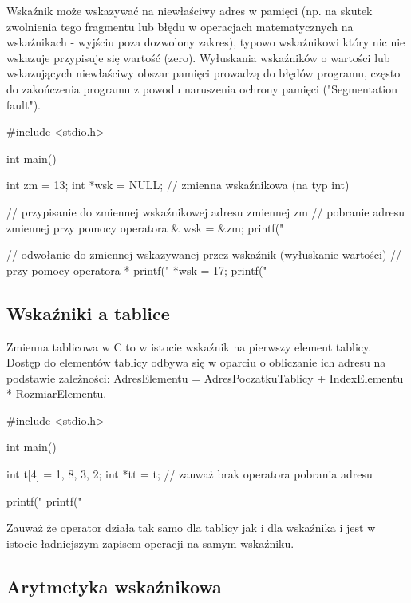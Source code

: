 \documentclass{pdfBooklets}
\begin{document}
Wskaźnik może wskazywać na niewłaściwy adres w pamięci (np. na skutek zwolnienia tego fragmentu lub błędu w operacjach matematycznych na wskaźnikach - wyjściu poza dozwolony zakres), typowo wskaźnikowi który nic nie wskazuje przypisuje się wartość  (zero). Wyłuskania wskaźników o wartości  lub wskazujących niewłaściwy obszar pamięci prowadzą do błędów programu, często do zakończenia programu z powodu naruszenia ochrony pamięci ("Segmentation fault"). 

\begin{CodeFrame*}[c]{}
#include <stdio.h>

int main() {
  int zm = 13;
  int *wsk = NULL; // zmienna wskaźnikowa (na typ int)
  
  // przypisanie do zmiennej wskaźnikowej adresu zmiennej zm
  // pobranie adresu zmiennej przy pomocy operatora &
  wsk = &zm;
  printf("%
  
  // odwołanie do zmiennej wskazywanej przez wskaźnik (wyłuskanie wartości)
  // przy pomocy operatora *
  printf("%
  *wsk = 17;
  printf("%
}
\end{CodeFrame*}

\subsection{Wskaźniki a tablice}

Zmienna tablicowa w C to w istocie wskaźnik na pierwszy element tablicy.
Dostęp do elementów tablicy odbywa się w oparciu o obliczanie ich adresu na podstawie zależności: AdresElementu = AdresPoczatkuTablicy + IndexElementu * RozmiarElementu.

\begin{CodeFrame*}[c]{}
#include <stdio.h>

int main() {
  int t[4] = {1, 8, 3, 2};
  int *tt = t; // zauważ brak operatora pobrania adresu
  
  printf("%
  printf("%
}
\end{CodeFrame*}

Zauważ że operator  działa tak samo dla tablicy jak i dla wskaźnika i jest w istocie ładniejszym zapisem operacji  na samym wskaźniku.

\subsection{Arytmetyka wskaźnikowa}
\end{document}
